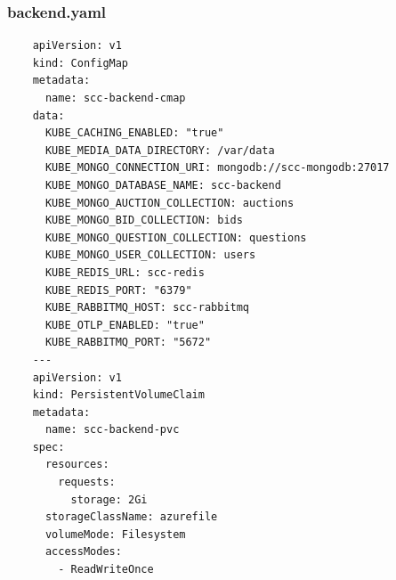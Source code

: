 \documentclass[runningheads]{llncs}
\begin{document}
\subsubsection{backend.yaml}
\begin{verbatim}
    apiVersion: v1
    kind: ConfigMap
    metadata:
      name: scc-backend-cmap
    data:
      KUBE_CACHING_ENABLED: "true"
      KUBE_MEDIA_DATA_DIRECTORY: /var/data
      KUBE_MONGO_CONNECTION_URI: mongodb://scc-mongodb:27017
      KUBE_MONGO_DATABASE_NAME: scc-backend
      KUBE_MONGO_AUCTION_COLLECTION: auctions
      KUBE_MONGO_BID_COLLECTION: bids
      KUBE_MONGO_QUESTION_COLLECTION: questions
      KUBE_MONGO_USER_COLLECTION: users
      KUBE_REDIS_URL: scc-redis
      KUBE_REDIS_PORT: "6379"
      KUBE_RABBITMQ_HOST: scc-rabbitmq
      KUBE_OTLP_ENABLED: "true"
      KUBE_RABBITMQ_PORT: "5672"
    ---
    apiVersion: v1
    kind: PersistentVolumeClaim
    metadata:
      name: scc-backend-pvc
    spec:
      resources:
        requests:
          storage: 2Gi
      storageClassName: azurefile
      volumeMode: Filesystem
      accessModes:
        - ReadWriteOnce
    

\end{verbatim}
\end{document}
